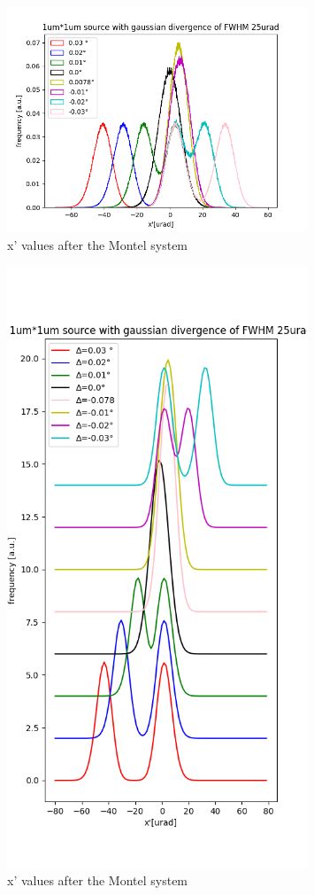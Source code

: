 \documentclass[a4paper]{article}
\begin{document}
\begin{figure}[H]
\centering
\includegraphics[width=0.8\textwidth]{histogram.png}
\caption{\label{fig:histogram} x' values after the Montel system}
\end{figure}

\begin{figure}[H]
\centering
\includegraphics[width=0.8\textwidth]{histogram2.png}
\caption{\label{fig:histogram} x' values after the Montel system}
\end{figure}
\end{document}

